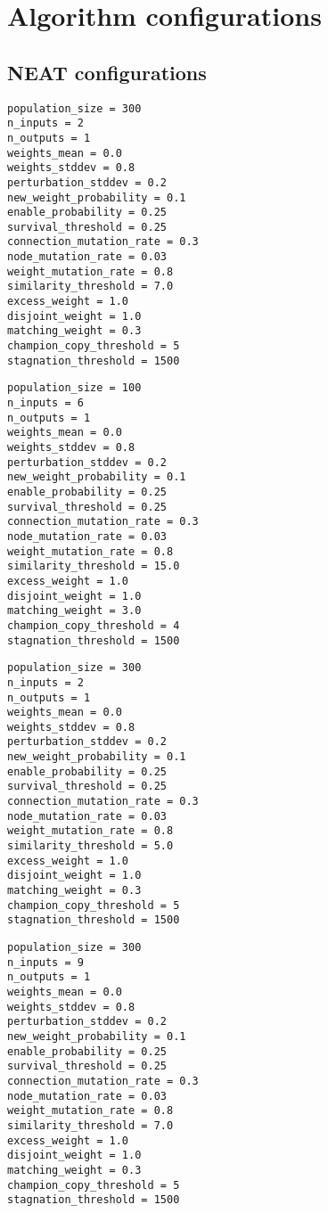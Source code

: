 \chapter{Algorithm configurations}
\label{app:configurations}

\section{NEAT configurations}

\begin{lstlisting}[label=verb:neat_xor_config,caption=NEAT XOR configuration]
population_size = 300
n_inputs = 2
n_outputs = 1
weights_mean = 0.0
weights_stddev = 0.8
perturbation_stddev = 0.2
new_weight_probability = 0.1
enable_probability = 0.25
survival_threshold = 0.25
connection_mutation_rate = 0.3
node_mutation_rate = 0.03
weight_mutation_rate = 0.8
similarity_threshold = 7.0
excess_weight = 1.0
disjoint_weight = 1.0
matching_weight = 0.3
champion_copy_threshold = 5
stagnation_threshold = 1500
\end{lstlisting}

\begin{lstlisting}[label=verb:neat_pole_config,caption=NEAT Pole Balancing configuration]
population_size = 100
n_inputs = 6
n_outputs = 1
weights_mean = 0.0
weights_stddev = 0.8
perturbation_stddev = 0.2
new_weight_probability = 0.1
enable_probability = 0.25
survival_threshold = 0.25
connection_mutation_rate = 0.3
node_mutation_rate = 0.03
weight_mutation_rate = 0.8
similarity_threshold = 15.0
excess_weight = 1.0
disjoint_weight = 1.0
matching_weight = 3.0
champion_copy_threshold = 4
stagnation_threshold = 1500
\end{lstlisting}

\begin{lstlisting}[label=verb:neat_sphere_config,caption=NEAT unit sphere classification configuration]
population_size = 300
n_inputs = 2
n_outputs = 1
weights_mean = 0.0
weights_stddev = 0.8
perturbation_stddev = 0.2
new_weight_probability = 0.1
enable_probability = 0.25
survival_threshold = 0.25
connection_mutation_rate = 0.3
node_mutation_rate = 0.03
weight_mutation_rate = 0.8
similarity_threshold = 5.0
excess_weight = 1.0
disjoint_weight = 1.0
matching_weight = 0.3
champion_copy_threshold = 5
stagnation_threshold = 1500
\end{lstlisting}

\begin{lstlisting}[label=verb:neat_proben1_config,caption=NEAT Proben1 Cancer1 configuration]
population_size = 300
n_inputs = 9
n_outputs = 1
weights_mean = 0.0
weights_stddev = 0.8
perturbation_stddev = 0.2
new_weight_probability = 0.1
enable_probability = 0.25
survival_threshold = 0.25
connection_mutation_rate = 0.3
node_mutation_rate = 0.03
weight_mutation_rate = 0.8
similarity_threshold = 7.0
excess_weight = 1.0
disjoint_weight = 1.0
matching_weight = 0.3
champion_copy_threshold = 5
stagnation_threshold = 1500
\end{lstlisting}

